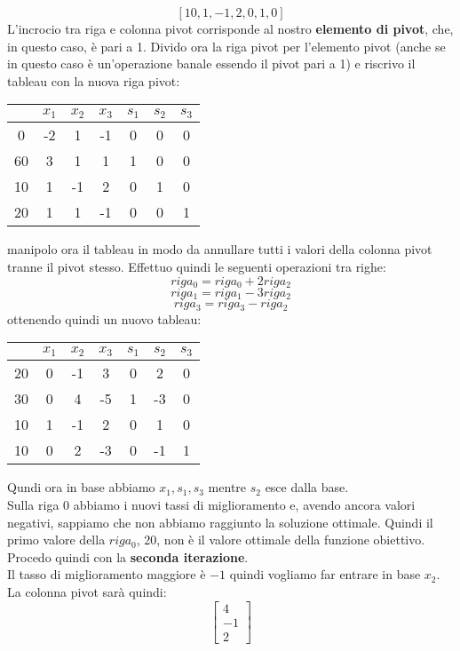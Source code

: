 \documentclass[a4paper,12pt, oneside]{book}
\begin{document}
\[\left[
    10,1,-1,2,0,1,0
  \right]\]
L'incrocio tra riga e colonna pivot corrisponde al nostro
\textbf{elemento di pivot}, che, in questo caso, è pari a 1.
Divido ora la riga pivot per l'elemento pivot (anche se in questo caso
è un'operazione banale essendo il pivot pari a 1) e riscrivo il
tableau con la nuova riga pivot:
\begin{center}
  \begin{tabular}{c|cccccc}
    & $x_1$ & $x_2$ & $x_3$ & $s_1$ & $s_2$ & $s_3$\\
    \hline
    0 & -2 & 1 & -1 & 0 & 0 & 0\\
    \hline
    60 & 3 & 1 & 1 & 1 & 0 & 0\\
    10 & 1 & -1 & 2 & 0 & 1 & 0\\
    20 & 1 & 1 & -1 & 0 & 0 & 1
  \end{tabular}
\end{center}
manipolo ora il tableau in modo da annullare tutti i valori della
colonna pivot tranne il pivot stesso. Effettuo quindi le seguenti
operazioni tra righe:
\[riga_0=riga_0+2riga_2\]
\[riga_1=riga_1-3riga_2\]
\[riga_3=riga_3-riga_2\]
ottenendo quindi un nuovo tableau:
\begin{center}
  \begin{tabular}{c|cccccc}
    & $x_1$ & $x_2$ & $x_3$ & $s_1$ & $s_2$ & $s_3$\\
    \hline
    20 & 0 & -1 & 3 & 0 & 2 & 0\\
    \hline
    30 & 0 & 4 & -5 & 1 & -3 & 0\\
    10 & 1 & -1 & 2 & 0 & 1 & 0\\
    10 & 0 & 2 & -3 & 0 & -1 & 1
  \end{tabular}
\end{center}
Qundi ora in base abbiamo $x_1,s_1,s_3$ mentre $s_2$ esce dalla
base.\\
Sulla riga 0 abbiamo i nuovi tassi di miglioramento e, avendo ancora
valori negativi, sappiamo che non abbiamo raggiunto la soluzione
ottimale. Quindi il primo valore della $riga_0$, 20, non è il valore
ottimale della funzione obiettivo.\\
Procedo quindi con la \textbf{seconda iterazione}.\\
Il tasso di miglioramento maggiore è $-1$ quindi vogliamo far entrare
in base $x_2$. La colonna pivot sarà quindi:
\[
  \left[\begin{matrix}
    4\\
    -1\\
    2
  \end{matrix}\right]
\]
\end{document}
